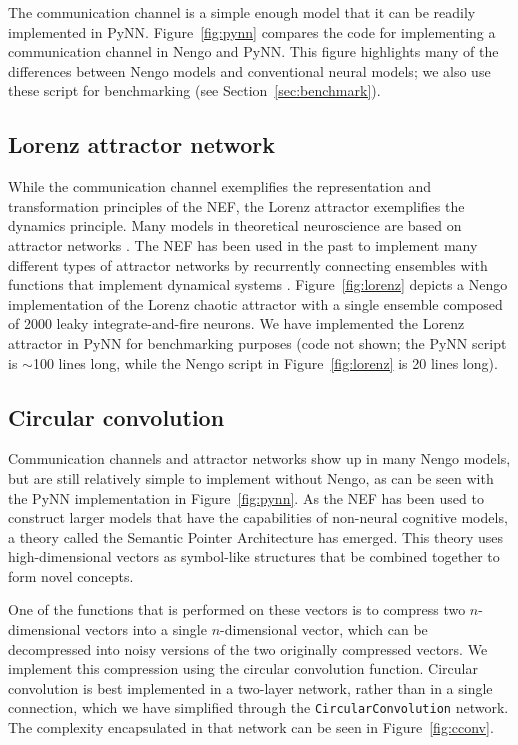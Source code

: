 \documentclass{frontiersSCNS}
\begin{document}
The communication channel
is a simple enough model
that it can be readily implemented in PyNN.
Figure~\ref{fig:pynn} compares the code
for implementing a communication channel in Nengo and PyNN.
This figure highlights many of the differences
between Nengo models and conventional neural models;
we also use these script for benchmarking
(see Section~\ref{sec:benchmark}).

\subsection{Lorenz attractor network} \label{sec:lorenz}

While the communication channel exemplifies
the representation and transformation
principles of the NEF,
the Lorenz attractor exemplifies the dynamics principle.
Many models in theoretical neuroscience
are based on attractor networks \citep{amit1992, deco2003}.
The NEF has been used in the past
to implement many different types of
attractor networks by recurrently connecting
ensembles with functions that implement
dynamical systems \citep{eliasmith2005}.
Figure~\ref{fig:lorenz} depicts
a Nengo implementation of the Lorenz chaotic attractor
with a single ensemble
composed of 2000 leaky integrate-and-fire neurons.
We have implemented the Lorenz attractor
in PyNN for benchmarking purposes
(code not shown; the PyNN script is $\sim$100 lines long,
while the Nengo script in Figure~\ref{fig:lorenz}
is 20 lines long).

\subsection{Circular convolution} \label{sec:cconv}

Communication channels and attractor networks
show up in many Nengo models,
but are still relatively simple
to implement without Nengo,
as can be seen with the PyNN implementation
in Figure~\ref{fig:pynn}.
As the NEF has been used to construct
larger models that have the capabilities
of non-neural cognitive models,
a theory called the
Semantic Pointer Architecture \citep{eliasmith2013}
has emerged.
This theory uses high-dimensional vectors
as symbol-like structures
that be combined together to form
novel concepts.

One of the functions that
is performed on these vectors
is to compress two $n$-dimensional vectors
into a single $n$-dimensional vector,
which can be decompressed
into noisy versions of
the two originally compressed vectors.
We implement this compression
using the circular convolution function.
Circular convolution
is best implemented in a two-layer network,
rather than in a single connection,
which we have simplified through
the \texttt{CircularConvolution} network.
The complexity encapsulated in that network
can be seen in Figure~\ref{fig:cconv}.
\end{document}
